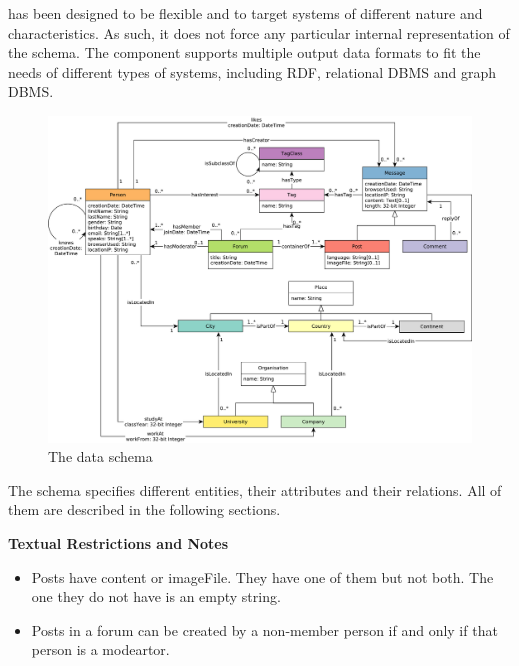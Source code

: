 \ldbcsnb has been designed to be flexible and to target systems of different
nature and characteristics. As such, it does not force any particular internal
representation of the schema. The \datagen component
supports multiple output data formats to
fit the needs of different types of systems, including RDF, relational DBMS and
graph DBMS.


\begin{figure}[htbp]
	\centering
	\includegraphics[width=\linewidth]{figures/schema}
	\caption{The \ldbcsnb data schema}
	\label{figure:schema}
\end{figure}

The schema specifies different entities, their attributes and their relations.
All of them are described in the following sections.

{\flushleft \textbf{Textual Restrictions and Notes}}
\begin{itemize}
    \item Posts have content or imageFile. They have one of them but not both. The one they do not have is an empty string.
    \item Posts in a forum can be created by a non-member person if and only if that person is a modeartor.
\end{itemize}

